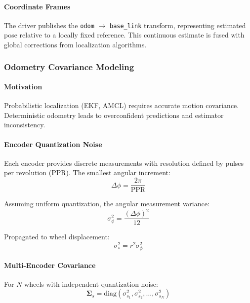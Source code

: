 \paragraph{Coordinate Frames}
The driver publishes the \texttt{odom} $\rightarrow$ \texttt{base\_link} transform, representing estimated pose relative to a locally fixed reference. This continuous estimate is fused with global corrections from localization algorithms.

\subsubsection{Odometry Covariance Modeling}

\paragraph{Motivation}
Probabilistic localization (EKF, AMCL) requires accurate motion covariance. Deterministic odometry leads to overconfident predictions and estimator inconsistency.

\paragraph{Encoder Quantization Noise}
Each encoder provides discrete measurements with resolution defined by pulses per revolution (PPR). The smallest angular increment:
\begin{equation}
\Delta \phi = \frac{2\pi}{\text{PPR}}
\label{eq:encoder_resolution}
\end{equation}

Assuming uniform quantization, the angular measurement variance:
\begin{equation}
\sigma_\phi^2 = \frac{(\Delta \phi)^2}{12}
\label{eq:angular_variance}
\end{equation}

Propagated to wheel displacement:
\begin{equation}
\sigma_s^2 = r^2 \sigma_\phi^2
\label{eq:displacement_variance}
\end{equation}

\paragraph{Multi-Encoder Covariance}
For $N$ wheels with independent quantization noise:
\begin{equation}
\boldsymbol{\Sigma}_s = \text{diag}(\sigma_{s_1}^2, \sigma_{s_2}^2, \ldots, \sigma_{s_N}^2)
\label{eq:wheel_covariance}
\end{equation}

